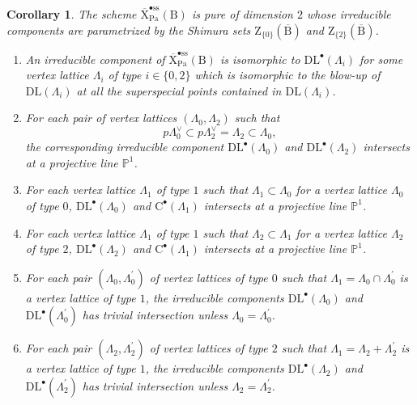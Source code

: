 \documentclass[10pt,a4paper]{amsart}
\newtheorem{corollary}{Corollary}
\def\PP{\mathbb{P}}
\def\Pa{\mathrm{Pa}}
\def\rmB{\mathrm{B}}
\def\rmC{\mathrm{C}}
\def\rmX{\mathrm{X}}
\def\rmZ{\mathrm{Z}}
\begin{document}
\begin{corollary}\label{ss-bullet}
The scheme $\overline{\rmX}^{\bullet\mathrm{ss}}_{\Pa}(\rmB)$ is pure of dimension $2$ whose irreducible components are parametrized by 
the Shimura sets $\rmZ_{\{0\}}(\overline{\rmB})$ and $\rmZ_{\{2\}}(\overline{\rmB})$. 
\begin{enumerate}

\item An irreducible component of $\overline{\rmX}^{\bullet\mathrm{ss}}_{\Pa}(\rmB)$ is isomorphic to $\mathrm{DL}^{\bullet}(\Lambda_{i})$ for some vertex lattice $\Lambda_{i}$ of type $i\in\{0,2\}$ which is isomorphic to the blow-up of $\mathrm{DL}(\Lambda_{i})$ at all the superspecial points contained in $\mathrm{DL}(\Lambda_{i})$.

\item For each pair of vertex lattices $(\Lambda_{0}, \Lambda_{2})$ such that
\begin{equation*}
p\Lambda^{\vee}_{0}\subset p\Lambda^{\vee}_{2}=\Lambda_{2}\subset \Lambda_{0}, 
\end{equation*}
the corresponding irreducible component $\mathrm{DL}^{\bullet}(\Lambda_{0})$ and $\mathrm{DL}^{\bullet}(\Lambda_{2})$ intersects at a projective line $\PP^{1}$.

\item For each vertex lattice $\Lambda_{1}$ of type $1$ such that $\Lambda_{1}\subset \Lambda_{0}$ for a vertex lattice $\Lambda_{0}$ of type $0$, $\mathrm{DL}^{\bullet}(\Lambda_{0})$ and  $\rmC^{\bullet}(\Lambda_{1})$ intersects at a projective line $\PP^{1}$.

\item For each vertex lattice $\Lambda_{1}$ of type $1$ such that $\Lambda_{2}\subset \Lambda_{1}$ for a vertex lattice $\Lambda_{2}$ of type $2$, $\mathrm{DL}^{\bullet}(\Lambda_{2})$ and $\rmC^{\bullet}(\Lambda_{1})$ intersects at a projective line $\PP^{1}$.

\item For each pair $(\Lambda_{0}, \Lambda^{\prime}_{0})$ of vertex lattices of type $0$ such that $\Lambda_{1}=\Lambda_{0}\cap\Lambda^{\prime}_{0}$ is a vertex lattice of type $1$, the irreducible components $\mathrm{DL}^{\bullet}(\Lambda_{0})$ and $\mathrm{DL}^{\bullet}(\Lambda^{\prime}_{0})$ has trivial intersection unless $\Lambda_{0}=\Lambda^{\prime}_{0}$.

\item For each pair $(\Lambda_{2}, \Lambda^{\prime}_{2})$ of vertex lattices of type $2$ such that $\Lambda_{1}=\Lambda_{2}+\Lambda^{\prime}_{2}$ is a vertex lattice of type $1$, the irreducible components $\mathrm{DL}^{\bullet}(\Lambda_{2})$ and $\mathrm{DL}^{\bullet}(\Lambda^{\prime}_{2})$ has trivial intersection unless $\Lambda_{2}=\Lambda^{\prime}_{2}$.
\end{enumerate}
\end{corollary}
\end{document}
